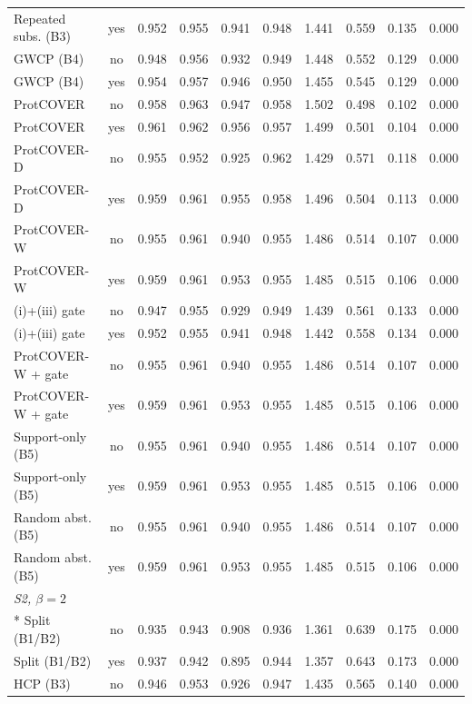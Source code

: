 \begin{longtable}{lccccccccc}
Repeated subs. (B3) & yes & 0.952 & 0.955 & 0.941 & 0.948 & 1.441 & 0.559 & 0.135 & 0.000 \\
GWCP (B4) & no & 0.948 & 0.956 & 0.932 & 0.949 & 1.448 & 0.552 & 0.129 & 0.000 \\
GWCP (B4) & yes & 0.954 & 0.957 & 0.946 & 0.950 & 1.455 & 0.545 & 0.129 & 0.000 \\
ProtCOVER & no & 0.958 & 0.963 & 0.947 & 0.958 & 1.502 & 0.498 & 0.102 & 0.000 \\
ProtCOVER & yes & 0.961 & 0.962 & 0.956 & 0.957 & 1.499 & 0.501 & 0.104 & 0.000 \\
ProtCOVER-D & no & 0.955 & 0.952 & 0.925 & 0.962 & 1.429 & 0.571 & 0.118 & 0.000 \\
ProtCOVER-D & yes & 0.959 & 0.961 & 0.955 & 0.958 & 1.496 & 0.504 & 0.113 & 0.000 \\
ProtCOVER-W & no & 0.955 & 0.961 & 0.940 & 0.955 & 1.486 & 0.514 & 0.107 & 0.000 \\
ProtCOVER-W & yes & 0.959 & 0.961 & 0.953 & 0.955 & 1.485 & 0.515 & 0.106 & 0.000 \\
(i)+(iii) gate & no & 0.947 & 0.955 & 0.929 & 0.949 & 1.439 & 0.561 & 0.133 & 0.000 \\
(i)+(iii) gate & yes & 0.952 & 0.955 & 0.941 & 0.948 & 1.442 & 0.558 & 0.134 & 0.000 \\
ProtCOVER-W + gate & no & 0.955 & 0.961 & 0.940 & 0.955 & 1.486 & 0.514 & 0.107 & 0.000 \\
ProtCOVER-W + gate & yes & 0.959 & 0.961 & 0.953 & 0.955 & 1.485 & 0.515 & 0.106 & 0.000 \\
Support-only (B5) & no & 0.955 & 0.961 & 0.940 & 0.955 & 1.486 & 0.514 & 0.107 & 0.000 \\
Support-only (B5) & yes & 0.959 & 0.961 & 0.953 & 0.955 & 1.485 & 0.515 & 0.106 & 0.000 \\
Random abst. (B5) & no & 0.955 & 0.961 & 0.940 & 0.955 & 1.486 & 0.514 & 0.107 & 0.000 \\
Random abst. (B5) & yes & 0.959 & 0.961 & 0.953 & 0.955 & 1.485 & 0.515 & 0.106 & 0.000 \\
\midrule
\multicolumn{10}{l}{\emph{S2, $\beta=2$}}\\*
Split (B1/B2) & no & 0.935 & 0.943 & 0.908 & 0.936 & 1.361 & 0.639 & 0.175 & 0.000 \\
Split (B1/B2) & yes & 0.937 & 0.942 & 0.895 & 0.944 & 1.357 & 0.643 & 0.173 & 0.000 \\
HCP (B3) & no & 0.946 & 0.953 & 0.926 & 0.947 & 1.435 & 0.565 & 0.140 & 0.000 \\

\end{longtable}
